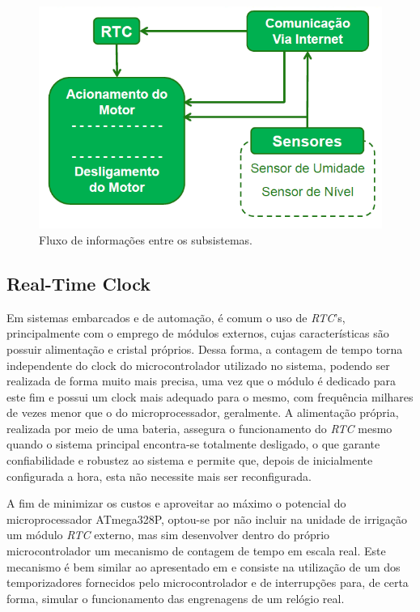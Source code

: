 \documentclass[conference]{IEEEtran}
\begin{document}
\begin{figure}[htbp]
\centerline{\includegraphics[angle=0, scale=.3]{images/Img2.png}}
\caption{Fluxo de informações entre os subsistemas.}
\label{fig2}
\end{figure}

\subsection{Real-Time Clock}

Em sistemas embarcados e de automação, é comum o uso de \textit{RTC}’s, principalmente com o emprego de módulos externos, cujas características são possuir alimentação e cristal próprios. Dessa forma, a contagem de tempo torna independente do clock do microcontrolador utilizado no sistema, podendo ser realizada de forma muito mais precisa, uma vez que o módulo é dedicado para este fim e possui um clock mais adequado para o mesmo, com frequência milhares de vezes menor que o do microprocessador, geralmente. A alimentação própria, realizada por meio de uma bateria, assegura o funcionamento do \textit{RTC} mesmo quando o sistema principal encontra-se totalmente desligado, o que garante confiabilidade e robustez ao sistema e permite que, depois de inicialmente configurada a hora, esta não necessite mais ser reconfigurada.

A fim de minimizar os custos e aproveitar ao máximo o potencial do microprocessador ATmega328P, optou-se por não incluir na unidade de irrigação um módulo \textit{RTC} externo, mas sim desenvolver dentro do próprio microcontrolador um mecanismo de contagem de tempo em escala real. Este mecanismo é bem similar ao apresentado em \cite{b1} e consiste na utilização de um dos temporizadores fornecidos pelo microcontrolador e de interrupções para, de certa forma, simular o funcionamento das engrenagens de um relógio real.
\end{document}
